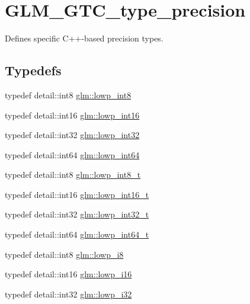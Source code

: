 \hypertarget{group__gtc__type__precision}{\section{G\-L\-M\-\_\-\-G\-T\-C\-\_\-type\-\_\-precision}
\label{group__gtc__type__precision}
}


Defines specific C++-\/based precision types.  


\subsection*{Typedefs}
\begin{DoxyCompactItemize}
\item 
typedef detail\-::int8 \hyperlink{group__gtc__type__precision_gaf9e675b6392764242ae87eb179e9d3d6}{glm\-::lowp\-\_\-int8}
\item 
typedef detail\-::int16 \hyperlink{group__gtc__type__precision_ga71fc0c399fa4780507748b643733f153}{glm\-::lowp\-\_\-int16}
\item 
typedef detail\-::int32 \hyperlink{group__gtc__type__precision_gad9939c9d6fec1c6accc02a83c6500f08}{glm\-::lowp\-\_\-int32}
\item 
typedef detail\-::int64 \hyperlink{group__gtc__type__precision_gab8a8e75af347592406e41b3ae2c0712b}{glm\-::lowp\-\_\-int64}
\item 
typedef detail\-::int8 \hyperlink{group__gtc__type__precision_gae6092311f6970a305c2df19a372360a3}{glm\-::lowp\-\_\-int8\-\_\-t}
\item 
typedef detail\-::int16 \hyperlink{group__gtc__type__precision_gae34c3d53c4c1434fc9f26538b0185667}{glm\-::lowp\-\_\-int16\-\_\-t}
\item 
typedef detail\-::int32 \hyperlink{group__gtc__type__precision_gad9567c806dc39f534174eef42663119d}{glm\-::lowp\-\_\-int32\-\_\-t}
\item 
typedef detail\-::int64 \hyperlink{group__gtc__type__precision_ga14d72e76d57c7f28eca8e933816c9fd6}{glm\-::lowp\-\_\-int64\-\_\-t}
\item 
typedef detail\-::int8 \hyperlink{group__gtc__type__precision_gaa2e13ee29c90f75658beed6082541097}{glm\-::lowp\-\_\-i8}
\item 
typedef detail\-::int16 \hyperlink{group__gtc__type__precision_gaf7bbfd31bcec25a416ea94d09efb5451}{glm\-::lowp\-\_\-i16}
\item 
typedef detail\-::int32 \hyperlink{group__gtc__type__precision_ga70fd34e8b8cffc92739161284ed77328}{glm\-::lowp\-\_\-i32}

\end{DoxyCompactItemize}

